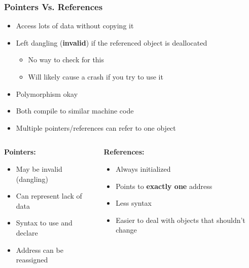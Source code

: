 \documentclass[glossy]{beamer}
\begin{document}
\begin{frame}[fragile=singleslide]
  \frametitle{Pointers Vs. References}

  \begin{itemize}
    \item Access lots of data without copying it
    \item Left dangling (\textbf{invalid}) if the referenced object is deallocated
    \begin{itemize}
      \item No way to check for this
      \item Will likely cause a crash if you try to use it
    \end{itemize}
    \item Polymorphism okay
    \item Both compile to similar machine code
    \item Multiple pointers/references can refer to one object
  \end{itemize}

  \begin{columns}
    \begin{column}{6cm}
      \textbf{Pointers:}
      \begin{itemize}
        \item May be invalid (dangling)
        \item Can represent lack of data
        \item Syntax to use and declare
        \item Address can be reassigned
      \end{itemize}
    \end{column}

    \begin{column}{6cm}
      \textbf{References:}
      \begin{itemize}
        \item Always initialized
        \item Points to \textbf{exactly one} address
        \item Less syntax
        \item Easier to deal with objects that shouldn't change
      \end{itemize}
    \end{column}
  \end{columns}
\end{frame}

\end{document}
